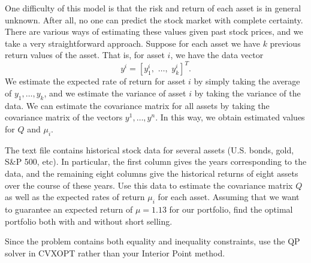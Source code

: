 One difficulty of this model is that the risk and return of each asset is in general unknown. After all, no one can predict the stock
market with complete certainty. There are various ways of estimating these values given past stock prices, and we take a very straightforward
approach. Suppose for each asset we have $k$ previous return values of the asset. That is, for asset $i$, we have the data vector
\[
y^i = [y^i_1,\,\, \ldots, \,\,y^i_k]^T.
\]
We estimate the expected rate of return for asset $i$ by simply taking the average of $y_1,\ldots,y_k$, and we estimate the variance
of asset $i$ by taking the variance of the data. We can estimate the covariance matrix for all assets by taking the covariance matrix of the
vectors $y^1,\ldots,y^n$. In this way, we obtain estimated values for $Q$ and $\mu_i$.

\begin{problem}
The text file  contains historical stock data for several assets (U.S. bonds, gold, S\&P 500, etc).
In particular, the first column gives the years corresponding to the data, and the remaining eight columns give the historical returns
of eight assets over the course of these years. Use this data to estimate the covariance matrix $Q$ as well as the expected rates
of return $\mu_i$ for each asset. Assuming that we want to guarantee an expected return of $\mu = 1.13$ for our portfolio,
find the optimal portfolio both with and without short selling.

Since the problem contains both equality and inequality constraints, use the QP solver in CVXOPT rather than your Interior Point method.

\end{problem} 
